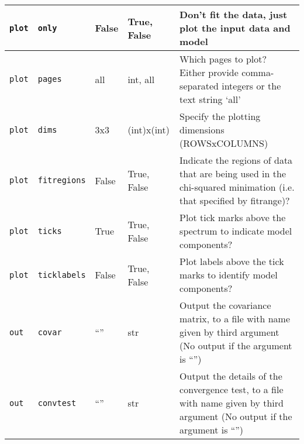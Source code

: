 \begin{center}
\begin{longtable}{p{1.5cm}p{2.5cm}p{2.0cm}p{2.0cm}p{5.0cm}}
\multicolumn{1}{p{1.5cm}}{\texttt{plot}} &
\multicolumn{1}{p{2.5cm}}{\texttt{only}} &
\multicolumn{1}{p{2.0cm}}{False} &
\multicolumn{1}{p{2.0cm}}{True, False} &
\multicolumn{1}{p{5.0cm}}{Don't fit the data, just plot the input data and model} \\ \midrule

\multicolumn{1}{p{1.5cm}}{\texttt{plot}} &
\multicolumn{1}{p{2.5cm}}{\texttt{pages}} &
\multicolumn{1}{p{2.0cm}}{all} &
\multicolumn{1}{p{2.0cm}}{int, all} &
\multicolumn{1}{p{5.0cm}}{Which pages to plot? Either provide comma-separated integers or the text string `all'} \\ \midrule

\multicolumn{1}{p{1.5cm}}{\texttt{plot}} &
\multicolumn{1}{p{2.5cm}}{\texttt{dims}} &
\multicolumn{1}{p{2.0cm}}{3x3} &
\multicolumn{1}{p{2.0cm}}{(int)x(int)} &
\multicolumn{1}{p{5.0cm}}{Specify the plotting dimensions (ROWSxCOLUMNS)} \\ \midrule

\multicolumn{1}{p{1.5cm}}{\texttt{plot}} &
\multicolumn{1}{p{2.5cm}}{\texttt{fitregions}} &
\multicolumn{1}{p{2.0cm}}{False} &
\multicolumn{1}{p{2.0cm}}{True, False} &
\multicolumn{1}{p{5.0cm}}{Indicate the regions of data that are being used in the chi-squared minimation (i.e. that specified by fitrange)?} \\ \midrule

\multicolumn{1}{p{1.5cm}}{\texttt{plot}} &
\multicolumn{1}{p{2.5cm}}{\texttt{ticks}} &
\multicolumn{1}{p{2.0cm}}{True} &
\multicolumn{1}{p{2.0cm}}{True, False} &
\multicolumn{1}{p{5.0cm}}{Plot tick marks above the spectrum to indicate model components?} \\ \midrule

\multicolumn{1}{p{1.5cm}}{\texttt{plot}} &
\multicolumn{1}{p{2.5cm}}{\texttt{ticklabels}} &
\multicolumn{1}{p{2.0cm}}{False} &
\multicolumn{1}{p{2.0cm}}{True, False} &
\multicolumn{1}{p{5.0cm}}{Plot labels above the tick marks to identify model components?} \\ \midrule

\multicolumn{1}{p{1.5cm}}{\texttt{out}} &
\multicolumn{1}{p{2.5cm}}{\texttt{covar}} &
\multicolumn{1}{p{2.0cm}}{``''} &
\multicolumn{1}{p{2.0cm}}{str} &
\multicolumn{1}{p{5.0cm}}{Output the covariance matrix, to a file with name given by third argument (No output if the argument is ``'')} \\ \midrule

\multicolumn{1}{p{1.5cm}}{\texttt{out}} &
\multicolumn{1}{p{2.5cm}}{\texttt{convtest}} &
\multicolumn{1}{p{2.0cm}}{``''} &
\multicolumn{1}{p{2.0cm}}{str} &
\multicolumn{1}{p{5.0cm}}{Output the details of the convergence test, to a file with name given by third argument (No output if the argument is ``'')} \\ \midrule


\end{longtable}
\end{center}
